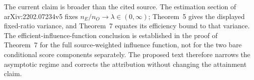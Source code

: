 The current claim is broader than the cited source. The estimation section of arXiv:2202.07234v5 fixes \(n_E/n_O\to\lambda\in(0,\infty)\); Theorem~5 gives the displayed fixed-ratio variance, and Theorem~7 equates its efficiency bound to that variance. The efficient-influence-function conclusion is established in the proof of Theorem~7 for the full source-weighted influence function, not for the two bare conditional score components separately. The proposed text therefore narrows the asymptotic regime and corrects the attribution without changing the attainment claim.